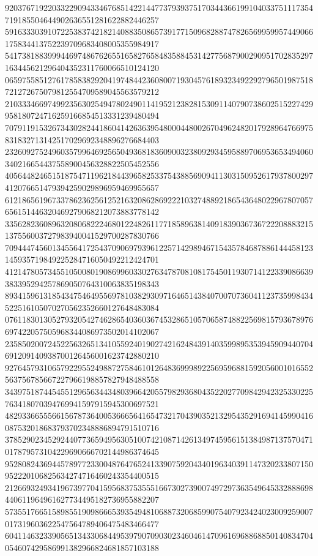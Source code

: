 \begin{DoxyCode}
      920376719220332290943346768514221447737939375170344366199104033751117354719185504644902636551281622882446257
      591633303910722538374218214088350865739177150968288747826569959957449066175834413752239709683408005355984917
      541738188399944697486762655165827658483588453142775687900290951702835297163445621296404352311760066510124120
      065975585127617858382920419748442360800719304576189323492292796501987518721272675079812554709589045563579212
      210333466974992356302549478024901141952123828153091140790738602515227429958180724716259166854513331239480494
      707911915326734302824418604142636395480004480026704962482017928964766975831832713142517029692348896276684403
      232609275249603579964692565049368183609003238092934595889706953653494060340216654437558900456328822505452556
      405644824651518754711962184439658253375438856909411303150952617937800297412076651479394259029896959469955657
      612186561967337862362561252163208628692221032748892186543648022967807057656151446320469279068212073883778142
      335628236089632080682224680122482611771858963814091839036736722208883215137556003727983940041529700287830766
      709444745601345564172543709069793961225714298946715435784687886144458123145935719849225284716050492212424701
      412147805734551050080190869960330276347870810817545011930714122339086639383395294257869050764310063835198343
      893415961318543475464955697810382930971646514384070070736041123735998434522516105070270562352660127648483084
      076118301305279320542746286540360367453286510570658748822569815793678976697422057505968344086973502014102067
      235850200724522563265134105592401902742162484391403599895353945909440704691209140938700126456001623742880210
      927645793106579229552498872758461012648369998922569596881592056001016552563756785667227966198857827948488558
      343975187445455129656344348039664205579829368043522027709842942325330225763418070394769941597915945300697521
      482933665556615678736400536665641654732170439035213295435291694145990416087532018683793702348886894791510716
      378529023452924407736594956305100742108714261349745956151384987137570471017879573104229690666702144986374645
      952808243694457897723300487647652413390759204340196340391147320233807150952220106825634274716460243354400515
      212669324934196739770415956837535551667302739007497297363549645332888698440611964961627734495182736955882207
      573551766515898551909866653935494810688732068599075407923424023009259007017319603622547564789406475483466477
      604114632339056513433068449539790709030234604614709616968868850140834704054607429586991382966824681857103188

\end{DoxyCode}
